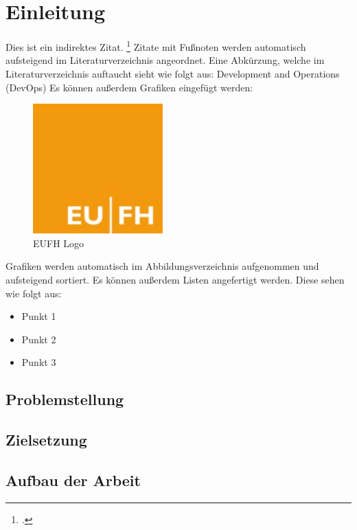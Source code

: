 \newpage
\section{Einleitung}
Dies ist ein indirektes Zitat. \footcite[Vgl.][S. 12]{Mustermann2022} Zitate mit Fußnoten werden automatisch aufsteigend im Literaturverzeichnis angeordnet.
\newline
\newline
Eine Abkürzung, welche im Literaturverzeichnis auftaucht sieht wie folgt aus:
\newline
\newline
Development and Operations (DevOps) 
\newline
\newline
Es können außerdem Grafiken eingefügt werden:
\begin{figure}[H]
\centering
\includegraphics[width=5cm]{abbildungen/eufh.jpeg} %
\caption[EUFH Logo]{EUFH Logo\protect\footnotemark}
\end{figure}
\nocite{Mustermann2022}
Grafiken werden automatisch im Abbildungsverzeichnis aufgenommen und aufsteigend sortiert.
\newline
\newline
Es können außerdem Listen angefertigt werden. Diese sehen wie folgt aus:
\begin{itemize}
    \item Punkt 1
    \item Punkt 2
    \item Punkt 3
\end{itemize}
\subsection{Problemstellung}
\subsection{Zielsetzung}
\subsection{Aufbau der Arbeit}
